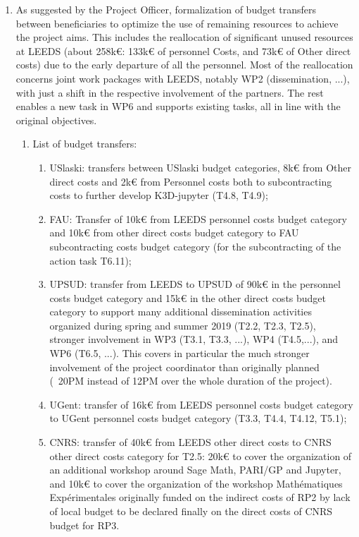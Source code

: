 \begin{enumerate}
\item As suggested by the Project Officer, formalization of budget
  transfers between beneficiaries to optimize the use of remaining
  resources to achieve the project aims. This includes the
  reallocation of significant unused resources at LEEDS (about 258k€:
  133k€ of personnel Costs, and 73k€ of Other direct costs) due to the
  early departure of all the personnel. Most of the reallocation
  concerns joint work packages with LEEDS, notably WP2 (dissemination,
  ...), with just a shift in the respective involvement of the
  partners. The rest enables a new task in WP6 and supports existing
  tasks, all in line with the original objectives.

\begin{enumerate}
\item List of budget transfers:
\begin{enumerate}
\item USlaski: transfers between USlaski budget categories, 8k€ from Other direct costs and 2k€ from Personnel costs both to subcontracting costs to further develop K3D-jupyter (T4.8, T4.9);
\item FAU: Transfer of 10k€ from LEEDS personnel costs budget category and 10k€ from other direct costs budget category to FAU subcontracting costs budget category (for the subcontracting of the action task T6.11);
\item UPSUD: transfer from LEEDS to UPSUD of 90k€ in the personnel
  costs budget category and 15k€ in the other direct costs budget
  category to support many additional dissemination activities
  organized during spring and summer 2019 (T2.2, T2.3, T2.5), stronger
  involvement in WP3 (T3.1, T3.3, ...), WP4 (T4.5,...), and WP6 (T6.5,
  ...). This covers in particular the much stronger involvement of the
  project coordinator than originally planned (~20PM instead of 12PM
  over the whole duration of the project).

\item UGent: transfer of 16k€ from LEEDS personnel costs budget
  category to UGent personnel costs budget category (T3.3, T4.4,
  T4.12, T5.1);
\item CNRS: transfer of 40k€ from LEEDS other direct costs to CNRS other
  direct costs category for T2.5: 20k€ to cover the organization of an
  additional workshop around Sage Math, PARI/GP and Jupyter, and 10k€
  to cover the organization of the workshop Mathématiques
  Expérimentales originally funded on the indirect costs of RP2 by
  lack of local budget to be declared finally on the direct costs of
  CNRS budget for RP3.
\end{enumerate}


\end{enumerate}
\end{enumerate}
